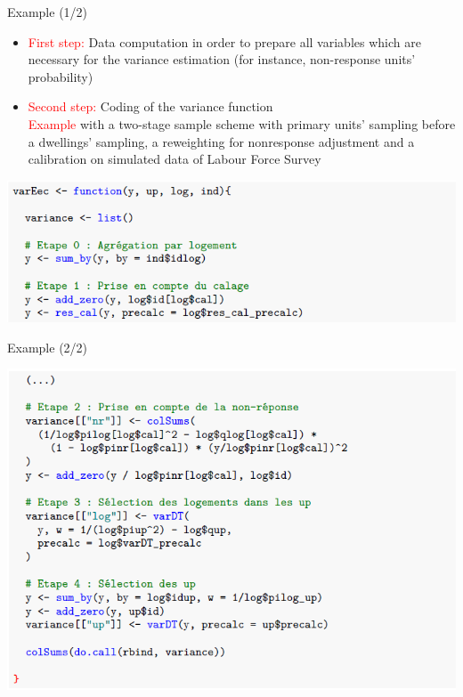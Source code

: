 \documentclass[xcolor=dvipsnames]{beamer}
\begin{document}
\begin{frame}{Example (1/2)}
    
\begin{itemize}
    \item \textcolor{red}{First step:} Data computation in order to prepare all variables which are necessary for the variance estimation (for instance, non-response units' probability)
    \vspace{0.5 cm} 
    \item \textcolor{red}{Second step:} Coding of the variance function \\ \textcolor{red}{Example} with a two-stage sample scheme with primary units' sampling before a dwellings' sampling, a reweighting for nonresponse adjustment and a calibration on simulated data of Labour Force Survey

\end{itemize}

\begin{center}
    \includegraphics[width = 10 cm]{EEC_1.png}
\end{center}    

\end{frame}

\begin{frame}{Example (2/2)}
    
\begin{center}
    \includegraphics[width = 10 cm]{EEC_2.png}
\end{center}

\end{frame}
\end{document}

